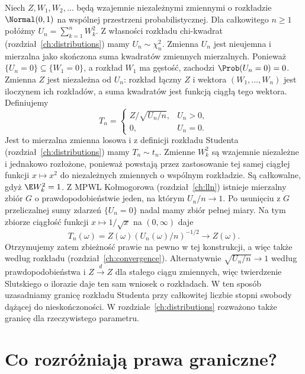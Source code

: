 \begin{przyklad}
Niech $Z,W_1,W_2,\ldots$ będą wzajemnie niezależnymi
zmiennymi o rozkładzie $\Normal(0,1)$ na wspólnej
przestrzeni probabilistycznej.
Dla całkowitego $n\geq1$ połóżmy $U_n=\sum_{k=1}^nW_k^2$.
Z własności rozkładu chi-kwadrat
(rozdział~\ref{ch:distributions}) mamy $U_n\sim\chi_n^2$.
Zmienna $U_n$ jest nieujemna i mierzalna jako
skończona suma kwadratów zmiennych mierzalnych.
Ponieważ $\{U_n=0\}\subseteq\{W_1=0\}$, a rozkład
$W_1$ ma gęstość, zachodzi $\Prob(U_n=0)=0$.
Zmienna $Z$ jest niezależna od $U_n$: rozkład łączny
$Z$ i wektora $(W_1,\ldots,W_n)$ jest iloczynem
ich rozkładów, a suma kwadratów jest funkcją ciągłą
tego wektora.
Definiujemy
\[
T_n=\begin{cases}
Z/\sqrt{U_n/n},&U_n>0,\\
0,&U_n=0.
\end{cases}
\]
Jest to mierzalna zmienna losowa i z definicji
rozkładu Studenta (rozdział~\ref{ch:distributions})
mamy $T_n\sim t_n$.
Zmienne $W_k^2$ są wzajemnie niezależne i jednakowo
rozłożone, ponieważ powstają przez zastosowanie
tej samej ciągłej funkcji $x\mapsto x^2$ do
niezależnych zmiennych o wspólnym rozkładzie.
Są całkowalne, gdyż $\E W_k^2=1$.
Z MPWL Kołmogorowa (rozdział~\ref{ch:lln}) istnieje
mierzalny zbiór $G$ o prawdopodobieństwie jeden,
na którym $U_n/n\to1$.
Po usunięciu z $G$ przeliczalnej sumy zdarzeń
$\{U_n=0\}$ nadal mamy zbiór pełnej miary.
Na tym zbiorze ciągłość funkcji
$x\mapsto1/\sqrt x$ na $(0,\infty)$ daje
\[
T_n(\omega)=Z(\omega)(U_n(\omega)/n)^{-1/2}
\longrightarrow Z(\omega).
\]
Otrzymujemy zatem zbieżność prawie na pewno w tej
konstrukcji, a więc także według rozkładu
(rozdział~\ref{ch:convergence}).
Alternatywnie $\sqrt{U_n/n}\to1$ według
prawdopodobieństwa i $Z\xrightarrow{d}Z$ dla stałego
ciągu zmiennych, więc twierdzenie Slutskiego o ilorazie
daje ten sam wniosek o rozkładach.
W ten sposób uzasadniamy granicę rozkładu Studenta
przy całkowitej liczbie stopni swobody dążącej
do nieskończoności. W rozdziale~\ref{ch:distributions}
rozważono także granicę dla rzeczywistego parametru.
\end{przyklad}

\section{Co rozróżniają prawa graniczne?}

